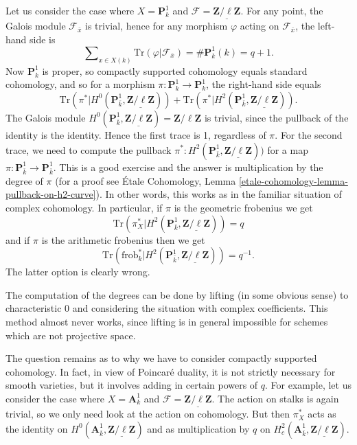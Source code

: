 \medskip\noindent
Let us consider the case where $X = \mathbf{P}^1_k$ and $\mathcal{F} =
\underline{\mathbf{Z}/\ell\mathbf{Z}}$. For any point, the Galois module
$\mathcal{F}_{\bar x}$ is trivial, hence for any morphism $\varphi$ acting on
$\mathcal{F}_{\bar x}$, the left-hand side is
$$
\sum\nolimits_{x \in X(k)} \text{Tr}(\varphi | \mathcal{F}_{\bar x}) =
\#\mathbf{P}^1_k(k) = q+1.
$$
Now $\mathbf{P}^1_k$ is proper, so compactly supported cohomology equals
standard cohomology, and so for a morphism $\pi : \mathbf{P}^1_k \to
\mathbf{P}^1_k$, the right-hand side equals
$$
\text{Tr}(\pi^* | H^0 (\mathbf{P}^1_{\bar k},
\underline{\mathbf{Z}/\ell\mathbf{Z}})) + \text{Tr}(\pi^* | H^2
(\mathbf{P}^1_{\bar k}, \underline{\mathbf{Z}/\ell\mathbf{Z}})).
$$
The Galois module $H^0 (\mathbf{P}^1_{\bar k},
\underline{\mathbf{Z}/\ell\mathbf{Z}}) = \mathbf{Z}/\ell\mathbf{Z}$ is trivial,
since the pullback of the identity is the identity. Hence the first trace is 1,
regardless of $\pi$. For the second trace, we need to compute the pullback
$\pi^* : H^2(\mathbf{P}^1_{\bar k}, \underline{\mathbf{Z}/\ell\mathbf{Z}}))$
for a map $\pi : \mathbf{P}^1_{\bar k} \to \mathbf{P}^1_{\bar k}$. This is a
good exercise and the answer is multiplication by the degree of $\pi$
(for a proof see
\'Etale Cohomology, Lemma \ref{etale-cohomology-lemma-pullback-on-h2-curve}).
In other words, this works as in the familiar situation of complex cohomology.
In particular, if $\pi$ is the geometric frobenius we get
$$
\text{Tr}(\pi_X^* | H^2 (\mathbf{P}^1_{\bar k},
\underline{\mathbf{Z}/\ell\mathbf{Z}})) = q
$$
and if $\pi$ is the arithmetic frobenius then we get
$$
\text{Tr}(\text{frob}_k^* | H^2 (\mathbf{P}^1_{\bar k},
\underline{\mathbf{Z}/\ell\mathbf{Z}})) = q^{-1}.
$$
The latter option is clearly wrong.

\begin{remark}
\label{remark-compute-degree-lifting}
The computation of the degrees can be done by lifting (in some obvious sense)
to characteristic 0 and considering the situation with complex coefficients.
This method almost never works, since lifting is in general impossible for
schemes which are not projective space.
\end{remark}

\noindent
The question remains as to why we have to consider compactly supported
cohomology. In fact, in view of Poincar\'e duality, it is not strictly
necessary for smooth varieties, but it involves adding in certain powers
of $q$. For example, let us consider the case where
$X = \mathbf{A}^1_k$ and
$\mathcal{F} = \underline{\mathbf{Z}/\ell\mathbf{Z}}$.
The action on stalks is again trivial, so we only need look at the action
on cohomology. But then $\pi_X^*$ acts as the identity on
$H^0(\mathbf{A}^1_{\bar k}, \underline{\mathbf{Z}/\ell\mathbf{Z}})$
and as multiplication by $q$ on
$H^2_c(\mathbf{A}^1_{\bar k}, \underline{\mathbf{Z}/\ell\mathbf{Z}})$.




